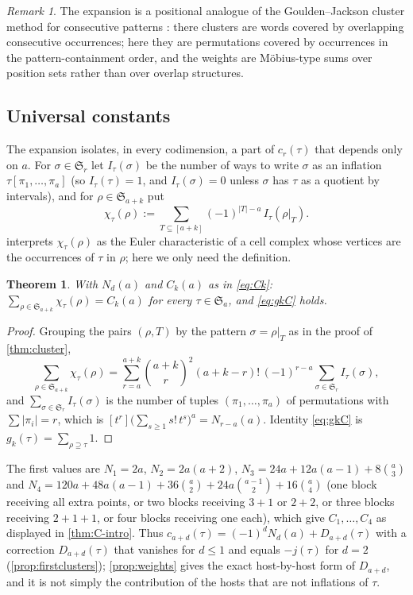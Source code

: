 \documentclass[11pt,reqno]{amsart}
\theoremstyle{plain}
\newtheorem{theorem}{Theorem}[section]
\theoremstyle{definition}
\theoremstyle{remark}
\newtheorem{remark}[remark]{Remark}
\newcommand{\Sym}{\mathfrak{S}}
\begin{document}
\begin{remark}
The expansion is a positional analogue of the Goulden--Jackson cluster method for consecutive patterns \cite{GouldenJackson1979}: there clusters are words covered by overlapping consecutive occurrences; here they are permutations covered by occurrences in the pattern-containment order, and the weights are Möbius-type sums over position sets rather than over overlap structures.
\end{remark}

\subsection{Universal constants}\label{sec:universal}

The expansion isolates, in every codimension, a part of $c_r(\tau)$ that depends only on $a$. For $\sigma\in\Sym_r$ let $I_\tau(\sigma)$ be the number of ways to write $\sigma$ as an inflation $\tau[\pi_1,\dots,\pi_a]$ (so $I_\tau(\tau)=1$, and $I_\tau(\sigma)=0$ unless $\sigma$ has $\tau$ as a quotient by intervals), and for $\rho\in\Sym_{a+k}$ put
\begin{equation}\label{eq:chi}
\chi_\tau(\rho):=\sum_{T\subseteq[a+k]}(-1)^{|T|-a}\,I_\tau(\rho|_T).
\end{equation}
 interprets $\chi_\tau(\rho)$ as the Euler characteristic of a cell complex whose vertices are the occurrences of $\tau$ in $\rho$; here we only need the definition.

\begin{theorem}\label{thm:universal}
With $N_d(a)$ and $C_k(a)$ as in \eqref{eq:Ck}: $\sum_{\rho\in\Sym_{a+k}}\chi_\tau(\rho)=C_k(a)$ for every $\tau\in\Sym_a$, and \eqref{eq:gkC} holds.
\end{theorem}

\begin{proof}
Grouping the pairs $(\rho,T)$ by the pattern $\sigma=\rho|_T$ as in the proof of \cref{thm:cluster},
\[
\sum_{\rho\in\Sym_{a+k}}\chi_\tau(\rho)=\sum_{r=a}^{a+k}\binom{a+k}r^2(a+k-r)!\,(-1)^{r-a}\sum_{\sigma\in\Sym_r}I_\tau(\sigma),
\]
and $\sum_{\sigma\in\Sym_r}I_\tau(\sigma)$ is the number of tuples $(\pi_1,\dots,\pi_a)$ of permutations with $\sum|\pi_i|=r$, which is $[t^{r}]\bigl(\sum_{s\ge1}s!\,t^s\bigr)^a=N_{r-a}(a)$. Identity \eqref{eq:gkC} is $g_k(\tau)=\sum_{\rho\supseteq\tau}1$.
\end{proof}

The first values are $N_1=2a$, $N_2=2a(a+2)$, $N_3=24a+12a(a-1)+8\binom a3$ and $N_4=120a+48a(a-1)+36\binom a2+24a\binom{a-1}2+16\binom a4$ (one block receiving all extra points, or two blocks receiving $3+1$ or $2+2$, or three blocks receiving $2+1+1$, or four blocks receiving one each), which give $C_1,\dots,C_4$ as displayed in \cref{thm:C-intro}. Thus $c_{a+d}(\tau)=(-1)^dN_d(a)+D_{a+d}(\tau)$ with a correction $D_{a+d}(\tau)$ that vanishes for $d\le1$ and equals $-j(\tau)$ for $d=2$ (\cref{prop:firstclusters}); \cref{prop:weights} gives the exact host-by-host form of $D_{a+d}$, and it is not simply the contribution of the hosts that are not inflations of $\tau$.
\end{document}
